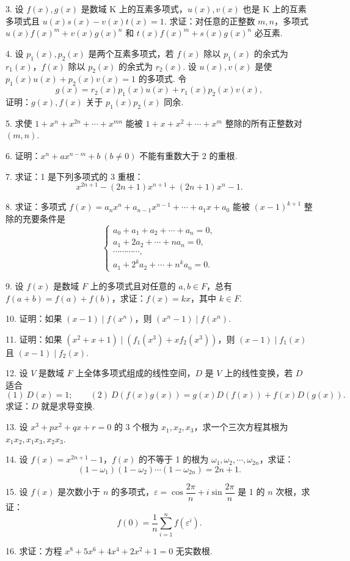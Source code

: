 \documentclass[UTF8,12pt,a4paper,fontset=fandol]{ctexart}
\begin{document}
3. 设 $f(x),g(x)$ 是数域 K 上的互素多项式，$u(x),v(x)$ 也是 K 上的互素多项式且 $u(x)s(x)-v(x)t(x)=1$. 求证：对任意的正整数 $m,n$，多项式 $u(x)f(x)^m+v(x)g(x)^n$ 和 $t(x)f(x)^m+s(x)g(x)^n$ 必互素.

4. 设 $p_1(x),p_2(x)$ 是两个互素多项式，若 $f(x)$ 除以 $p_1(x)$ 的余式为 $r_1(x)$，$f(x)$ 除以 $p_2(x)$ 的余式为 $r_2(x)$. 设 $u(x),v(x)$ 是使 $p_1(x)u(x)+p_2(x)v(x)=1$ 的多项式. 令
\[
g(x)=r_2(x)p_1(x)u(x)+r_1(x)p_2(x)v(x),
\]
证明：$g(x),f(x)$ 关于 $p_1(x)p_2(x)$ 同余.

5. 求使 $1+x^n+x^{2n}+\cdots+x^{mn}$ 能被 $1+x+x^2+\cdots+x^m$ 整除的所有正整数对 $(m,n)$.

6. 证明：$x^n+ax^{n-m}+b\ (b\ne0)$ 不能有重数大于 2 的重根.

7. 求证：1 是下列多项式的 3 重根：
\[
x^{2n+1}-(2n+1)x^{n+1}+(2n+1)x^n-1.
\]

8. 求证：多项式 $f(x)=a_nx^n+a_{n-1}x^{n-1}+\cdots+a_1x+a_0$ 能被 $(x-1)^{k+1}$ 整除的充要条件是
\[
\begin{cases}
a_0+a_1+a_2+\cdots+a_n=0,\\
a_1+2a_2+\cdots+na_n=0,\\
\cdots\cdots\cdots\cdots,\\
a_1+2^ka_2+\cdots+n^ka_n=0.
\end{cases}
\]

9. 设 $f(x)$ 是数域 $F$ 上的多项式且对任意的 $a,b\in F$，总有 $f(a+b)=f(a)+f(b)$，求证：$f(x)=kx$，其中 $k\in F$.

10. 证明：如果 $(x-1)\mid f(x^n)$，则 $(x^n-1)\mid f(x^n)$.

11. 证明：如果 $(x^2+x+1)\mid(f_1(x^3)+xf_2(x^3))$，则 $(x-1)\mid f_1(x)$ 且 $(x-1)\mid f_2(x)$.

12. 设 $V$ 是数域 $F$ 上全体多项式组成的线性空间，$D$ 是 $V$ 上的线性变换，若 $D$ 适合
\[
(1)\ D(x)=1;\qquad (2)\ D(f(x)g(x))=g(x)D(f(x))+f(x)D(g(x)).
\]
求证：$D$ 就是求导变换.

13. 设 $x^3+px^2+qx+r=0$ 的 3 个根为 $x_1,x_2,x_3$，求一个三次方程其根为 $x_1x_2,x_1x_3,x_2x_3$.

14. 设 $f(x)=x^{2n+1}-1$，$f(x)$ 的不等于 1 的根为 $\omega_1,\omega_2,\cdots,\omega_{2n}$，求证：
\[
(1-\omega_1)(1-\omega_2)\cdots(1-\omega_{2n})=2n+1.
\]

15. 设 $f(x)$ 是次数小于 $n$ 的多项式，$\varepsilon=\cos\dfrac{2\pi}{n}+i\sin\dfrac{2\pi}{n}$ 是 1 的 $n$ 次根，求证：
\[
f(0)=\frac{1}{n}\sum_{i=1}^n f(\varepsilon^i).
\]

16. 求证：方程 $x^8+5x^6+4x^4+2x^2+1=0$ 无实数根.
\end{document}

